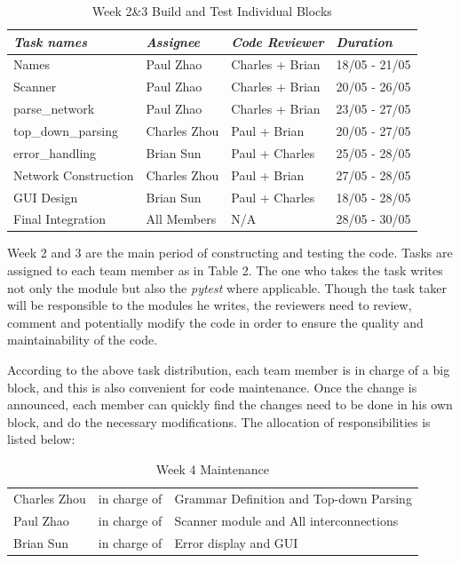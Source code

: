 \documentclass[12pt]{article}
\def\n{\noindent}
\begin{document}
\begin{table}[H]
\begin{tabular}{p{4.5cm}p{3.5cm}p{4cm}p{2.5cm}}
\textit{Task names} & \textit{Assignee} & \textit{Code Reviewer} & \textit{Duration}\\
\hline
Names & Paul Zhao & Charles + Brian & 18/05 - 21/05\\
Scanner & Paul Zhao & Charles + Brian & 20/05 - 26/05\\
parse\_network & Paul Zhao & Charles + Brian & 23/05 - 27/05\\
top\_down\_parsing & Charles Zhou & Paul + Brian & 20/05 - 27/05\\
error\_handling & Brian Sun & Paul + Charles & 25/05 - 28/05\\
Network Construction & Charles Zhou & Paul + Brian & 27/05 - 28/05\\
GUI Design & Brian Sun & Paul + Charles & 18/05 - 28/05\\
Final Integration & All Members & N/A & 28/05 - 30/05\\
\end{tabular}
\caption{Week 2\&3 Build and Test Individual Blocks}
\end{table}

\n Week 2 and 3 are the main period of constructing and testing the code. Tasks are assigned to each team member as in Table 2. The one who takes the task writes not only the module but also the \textit{pytest} where applicable. Though the task taker will be responsible to the modules he writes, the reviewers need to review, comment and potentially modify the code in order to ensure the quality and maintainability of the code. \par
\vspace{0.3cm}

\n According to the above task distribution, each team member is in charge of a big block, and this is also convenient for code maintenance. Once the change is announced, each member can quickly find the changes need to be done in his own block, and do the necessary modifications. The allocation of responsibilities is listed below:

\begin{table}[H]
\begin{tabular}{p{3cm}p{4cm}p{8cm}}
Charles Zhou & in charge of & Grammar Definition and Top-down Parsing\\
Paul Zhao & in charge of & Scanner module and All interconnections\\
Brian Sun & in charge of & Error display and GUI\\
\end{tabular}
\caption{Week 4 Maintenance}
\end{table}
\end{document}
